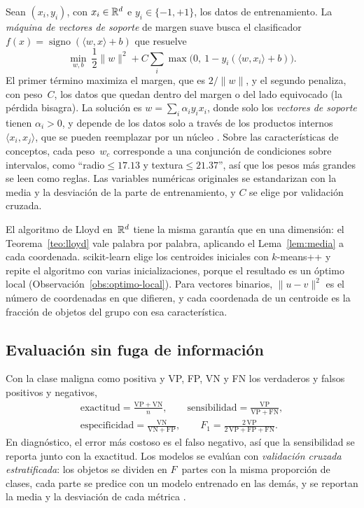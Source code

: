 Sean $(x_i, y_i)$, con $x_i \in \mathbb{R}^d$ e $y_i \in \{-1, +1\}$, los datos de entrenamiento. La \emph{máquina de vectores de soporte} de margen suave \parencite{cortes1995} busca el clasificador $f(x) = \operatorname{signo}(\langle w, x \rangle + b)$ que resuelve
\[
  \min_{w, b} \ \frac{1}{2} \lVert w \rVert^2 + C \sum_{i} \max\bigl( 0,\ 1 - y_i (\langle w, x_i \rangle + b) \bigr).
\]
El primer término maximiza el margen, que es $2/\lVert w \rVert$, y el segundo penaliza, con peso~$C$, los datos que quedan dentro del margen o del lado equivocado (la pérdida bisagra). La solución es $w = \sum_i \alpha_i y_i x_i$, donde solo los \emph{vectores de soporte} tienen $\alpha_i > 0$, y depende de los datos solo a través de los productos internos $\langle x_i, x_j \rangle$, que se pueden reemplazar por un núcleo \parencite{cortes1995, hastie2009}. Sobre las características de conceptos, cada peso~$w_c$ corresponde a una conjunción de condiciones sobre intervalos, como \enquote{radio${}\le 17.13$ y textura${}\le 21.37$}, así que los pesos más grandes se leen como reglas. Las variables numéricas originales se estandarizan con la media y la desviación de la parte de entrenamiento, y $C$ se elige por validación cruzada.

El algoritmo de Lloyd en~$\mathbb{R}^d$ tiene la misma garantía que en una dimensión: el Teorema~\ref{teo:lloyd} vale palabra por palabra, aplicando el Lema~\ref{lem:media} a cada coordenada. scikit-learn elige los centroides iniciales con $k$-means++ \parencite{arthur2007} y repite el algoritmo con varias inicializaciones, porque el resultado es un óptimo local (Observación~\ref{obs:optimo-local}). Para vectores binarios, $\lVert u - v \rVert^2$ es el número de coordenadas en que difieren, y cada coordenada de un centroide es la fracción de objetos del grupo con esa característica.


\subsection{Evaluación sin fuga de información}
\label{sec:evaluacion}

Con la clase maligna como positiva y VP, FP, VN y FN los verdaderos y falsos positivos y negativos,
\begin{gather*}
  \text{exactitud} = \frac{\mathrm{VP} + \mathrm{VN}}{n}, \qquad
  \text{sensibilidad} = \frac{\mathrm{VP}}{\mathrm{VP} + \mathrm{FN}}, \\
  \text{especificidad} = \frac{\mathrm{VN}}{\mathrm{VN} + \mathrm{FP}}, \qquad
  F_1 = \frac{2\,\mathrm{VP}}{2\,\mathrm{VP} + \mathrm{FP} + \mathrm{FN}}.
\end{gather*}
En diagnóstico, el error más costoso es el falso negativo, así que la sensibilidad se reporta junto con la exactitud. Los modelos se evalúan con \emph{validación cruzada estratificada}: los objetos se dividen en $F$~partes con la misma proporción de clases, cada parte se predice con un modelo entrenado en las demás, y se reportan la media y la desviación de cada métrica \parencite{hastie2009}.

